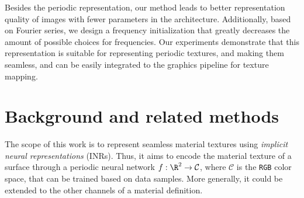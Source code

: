 Besides the periodic representation, our method leads to better representation quality of images with fewer parameters in the architecture. Additionally, based on Fourier series, we design a frequency initialization that greatly decreases the amount of possible choices for frequencies. 
Our experiments demonstrate that this representation is suitable for representing periodic textures, and making them seamless, and can be easily integrated to the graphics pipeline for texture mapping.




\section{Background and related methods}

The scope of this work is to represent seamless material textures using \textit{implicit neural representations} (INRs). 
Thus, it aims to encode the material texture of a surface through a periodic neural network $f:\R^2\to \mathcal{C}$, where $\mathcal{C}$ is the \texttt{RGB} color space, that can be trained based on data samples. More generally, it could be extended to the other channels of a material definition.


